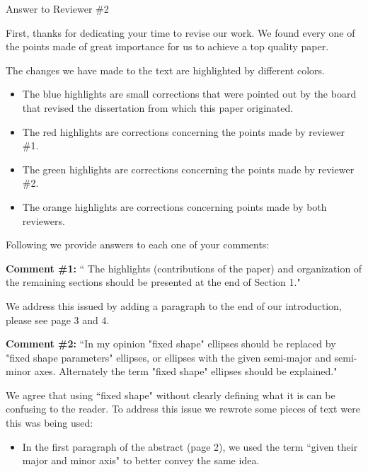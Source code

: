 
		
		\begin{letter}{}

		\opening{Answer to Reviewer \#2}
		
		First, thanks for dedicating your time to revise our work. We found every one of the points made of great importance for us to achieve a top quality paper.
		
		The changes we have made to the text are highlighted by different colors. 
		\begin{itemize}
			\item The {\color{blue} blue} highlights are small corrections that were pointed out by the board that revised the dissertation from which this paper originated.
			
			\item The {\color{Red} red} highlights are corrections concerning the points made by reviewer \#1.
			
			\item The {\color{Green} green} highlights are corrections concerning the points made by reviewer \#2.
			
			\item The {\color{Orange} orange} highlights are corrections concerning points made by both reviewers.
		\end{itemize}
		 
		Following we provide answers to each one of your comments:
		
		\textbf{Comment \#1:} `` The highlights (contributions of the paper) and organization of the remaining sections should be presented at the end of Section 1."
		
		We address this issued by adding a paragraph to the end of our introduction, please see page 3 and 4.
		
		\textbf{Comment \#2:} ``In my opinion "fixed shape" ellipses should be replaced by "fixed shape parameters" ellipses, or ellipses with the given semi-major and semi-minor axes. Alternately the term "fixed shape" ellipses should be explained."
		
		We agree that using ``fixed shape" without clearly defining what it is can be confusing to the reader. To address this issue we rewrote some pieces of text were this was being used:
		\begin{itemize}
			\item In the first paragraph of the abstract (page 2), we used the term ``given their major and minor axis" to better convey the same idea.
			

\end{itemize}
\end{letter}
